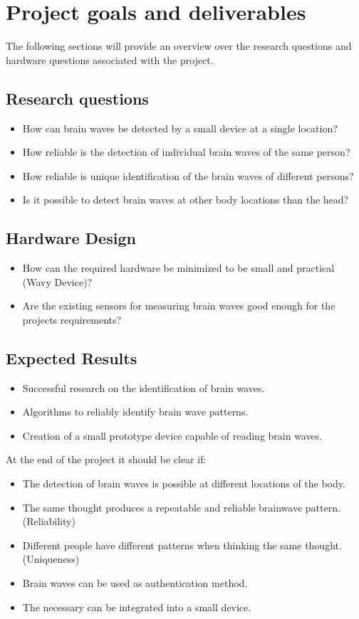 \section{Project goals and deliverables}
\label{sect:goals}
The following sections will provide an overview over the research questions and hardware questions associated with the project.
\subsection{Research questions}
\begin{itemize}
	\item How can brain waves be detected by a small device at a single location?
	\item How reliable is the detection of individual brain waves of the same person?
	\item How reliable is unique identification of the brain waves of different persons?
	\item Is it possible to detect brain waves at other body locations than the head?
\end{itemize}

\subsection{Hardware Design}
\begin{itemize}
	\item How can the required hardware be minimized to be small and practical (Wavy Device)?
	\item Are the existing sensors for measuring brain waves good enough for the projects requirements?
\end{itemize}

\subsection{Expected Results}
\begin{itemize}
	\item Successful research on the identification of brain waves.
	\item Algorithms to reliably identify brain wave patterns.
	\item Creation of a small prototype device capable of reading brain waves.
\end{itemize}

At the end of the project it should be clear if:
\begin{itemize}
	\item The detection of brain waves is possible at different locations of the body.
	\item The same thought produces a repeatable and reliable brainwave pattern. (Reliability)
	\item Different people have different patterns when thinking the same thought. (Uniqueness)
	\item Brain waves can be used as authentication method.
	\item The necessary can be integrated into a small device.
\end{itemize}

